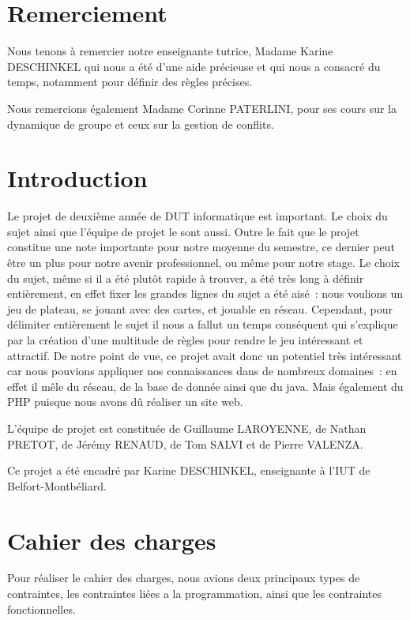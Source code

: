 \documentclass[a4paper, titlepage]{livret}
\begin{document}
\maketitle
\tableofcontents

\chapter{Remerciement}
Nous tenons à remercier notre enseignante tutrice, Madame Karine DESCHINKEL qui nous a été d'une aide précieuse et qui nous a consacré du temps, notamment pour définir des règles précises.

Nous remercions également Madame Corinne PATERLINI, pour ses cours sur la dynamique de groupe et ceux sur la gestion de conflits.

\chapter{Introduction}

	Le projet de deuxième année de DUT informatique est important. Le choix du sujet ainsi que l’équipe de projet le sont aussi. Outre le fait que le projet constitue une note importante pour notre moyenne du semestre, ce dernier peut être un plus pour notre avenir professionnel, ou même pour notre stage. Le choix du sujet, même si il a été plutôt rapide à trouver, a été très long à définir entièrement, en effet fixer les grandes lignes du sujet a été aisé : nous voulions un jeu de plateau, se jouant avec des cartes, et jouable en réseau. Cependant, pour délimiter entièrement le sujet il nous a fallut un temps conséquent qui s'explique par la création d'une multitude de règles pour rendre le jeu intéressant et attractif. De notre point de vue, ce projet avait donc un potentiel très intéressant car nous pouvions appliquer nos connaissances dans de nombreux domaines : en effet il mêle du réseau, de la base de donnée ainsi que du java. Mais également du PHP puisque nous avons dû réaliser un site web.
	
	L'équipe de projet est constituée de Guillaume LAROYENNE, de Nathan PRETOT, de Jérémy RENAUD, de Tom SALVI et de Pierre VALENZA.
	
	Ce projet a été encadré par Karine DESCHINKEL, enseignante à l'IUT de Belfort-Montbéliard. 

\chapter{Cahier des charges}
  Pour réaliser le cahier des charges, nous avions deux principaux types de contraintes, les contraintes liées a la programmation, ainsi que les contraintes fonctionnelles.
\end{document}
